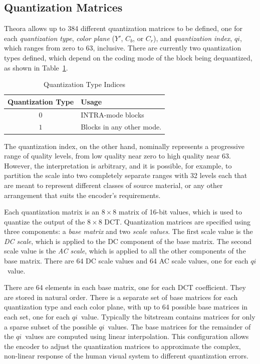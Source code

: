 \documentclass[11pt,letterpaper]{book}
\newcommand{\idx}[1]{{\ensuremath{\mathit{#1}}}}
\newcommand{\qi}{\idx{qi}}
\newcommand{\term}[1]{{\em #1}}
\numberwithin{equation}{chapter}
\numberwithin{figure}{chapter}
\numberwithin{table}{chapter}
\begin{document}
\subsection{Quantization Matrices}

Theora allows up to 384 different quantization matrices to be defined, one for
 each \term{quantization type}, \term{color plane} ($Y'$, $C_b$, or $C_r$), and
 \term{quantization index}, \qi, which ranges from zero to 63, inclusive.
There are currently two quantization types defined, which depend on the coding
 mode of the block being dequantized, as shown in Table~\ref{tab:quant-types}.

\begin{table}[htb]
\begin{center}
\begin{tabular}{cl}\toprule
Quantization Type & Usage                     \\\midrule
$0$               & INTRA-mode blocks         \\
$1$               & Blocks in any other mode. \\
\bottomrule\end{tabular}
\end{center}
\caption{Quantization Type Indices}
\label{tab:quant-types}
\end{table}

The quantization index, on the other hand, nominally represents a progressive
 range of quality levels, from low quality near zero to high quality near 63.
However, the interpretation is arbitrary, and it is possible, for example, to
 partition the scale into two completely separate ranges with 32 levels each
 that are meant to represent different classes of source material, or any
 other arrangement that suits the encoder's requirements.

Each quantization matrix is an $8\times 8$ matrix of 16-bit values, which is
 used to quantize the output of the $8\times 8$ DCT\@.
Quantization matrices are specified using three components: a
 \term{base matrix} and two \term{scale values}.
The first scale value is the \term{DC scale}, which is applied to the DC
 component of the base matrix.
The second scale value is the \term{AC scale}, which is applied to all the
 other components of the base matrix.
There are 64 DC scale values and 64 AC scale values, one for each \qi\ value.

There are 64 elements in each base matrix, one for each DCT coefficient.
They are stored in natural order.
There is a separate set of base matrices for each quantization type and each
 color plane, with up to 64 possible base matrices in each set, one for each
 \qi\ value.
Typically the bitstream contains matrices for only a sparse subset of the
 possible \qi\ values.
The base matrices for the remainder of the \qi\ values are computed using
 linear interpolation.
This configuration allows the encoder to adjust the quantization matrices to
 approximate the complex, non-linear response of the human visual system to
 different quantization errors.
\end{document}
